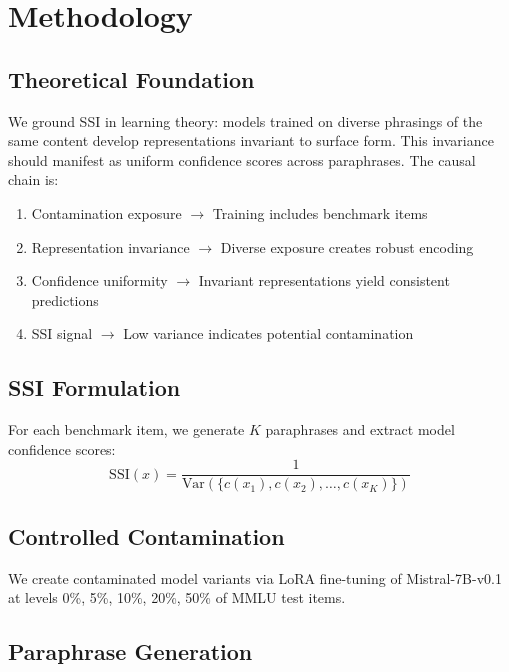 \section{Methodology}

\subsection{Theoretical Foundation}

We ground SSI in learning theory: models trained on diverse phrasings of the same content develop representations invariant to surface form. This invariance should manifest as uniform confidence scores across paraphrases. The causal chain is:

\begin{enumerate}
    \item Contamination exposure $\rightarrow$ Training includes benchmark items
    \item Representation invariance $\rightarrow$ Diverse exposure creates robust encoding
    \item Confidence uniformity $\rightarrow$ Invariant representations yield consistent predictions
    \item SSI signal $\rightarrow$ Low variance indicates potential contamination
\end{enumerate}

\subsection{SSI Formulation}

For each benchmark item, we generate $K$ paraphrases and extract model confidence scores:
\begin{equation}
\text{SSI}(x) = \frac{1}{\text{Var}(\{c(x_1), c(x_2), \ldots, c(x_K)\})}
\end{equation}

\subsection{Controlled Contamination}

We create contaminated model variants via LoRA fine-tuning of Mistral-7B-v0.1 at levels 0\%, 5\%, 10\%, 20\%, 50\% of MMLU test items.

\subsection{Paraphrase Generation}

